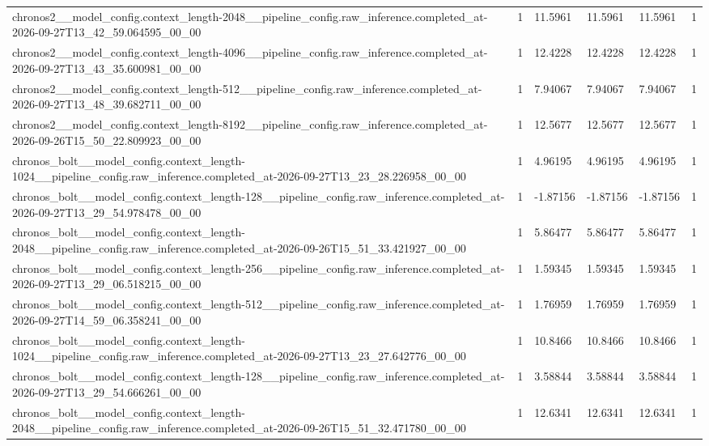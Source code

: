\begin{tabular}{llllll}
chronos2\_\_model\_config.context\_length-2048\_\_pipeline\_config.raw\_inference.completed\_at-2026-09-27T13\_42\_59.064595\_00\_00 & 1 & 11.5961 & 11.5961 & 11.5961 & 1 \\
chronos2\_\_model\_config.context\_length-4096\_\_pipeline\_config.raw\_inference.completed\_at-2026-09-27T13\_43\_35.600981\_00\_00 & 1 & 12.4228 & 12.4228 & 12.4228 & 1 \\
chronos2\_\_model\_config.context\_length-512\_\_pipeline\_config.raw\_inference.completed\_at-2026-09-27T13\_48\_39.682711\_00\_00 & 1 & 7.94067 & 7.94067 & 7.94067 & 1 \\
chronos2\_\_model\_config.context\_length-8192\_\_pipeline\_config.raw\_inference.completed\_at-2026-09-26T15\_50\_22.809923\_00\_00 & 1 & 12.5677 & 12.5677 & 12.5677 & 1 \\
chronos\_bolt\_\_model\_config.context\_length-1024\_\_pipeline\_config.raw\_inference.completed\_at-2026-09-27T13\_23\_28.226958\_00\_00 & 1 & 4.96195 & 4.96195 & 4.96195 & 1 \\
chronos\_bolt\_\_model\_config.context\_length-128\_\_pipeline\_config.raw\_inference.completed\_at-2026-09-27T13\_29\_54.978478\_00\_00 & 1 & -1.87156 & -1.87156 & -1.87156 & 1 \\
chronos\_bolt\_\_model\_config.context\_length-2048\_\_pipeline\_config.raw\_inference.completed\_at-2026-09-26T15\_51\_33.421927\_00\_00 & 1 & 5.86477 & 5.86477 & 5.86477 & 1 \\
chronos\_bolt\_\_model\_config.context\_length-256\_\_pipeline\_config.raw\_inference.completed\_at-2026-09-27T13\_29\_06.518215\_00\_00 & 1 & 1.59345 & 1.59345 & 1.59345 & 1 \\
chronos\_bolt\_\_model\_config.context\_length-512\_\_pipeline\_config.raw\_inference.completed\_at-2026-09-27T14\_59\_06.358241\_00\_00 & 1 & 1.76959 & 1.76959 & 1.76959 & 1 \\
chronos\_bolt\_\_model\_config.context\_length-1024\_\_pipeline\_config.raw\_inference.completed\_at-2026-09-27T13\_23\_27.642776\_00\_00 & 1 & 10.8466 & 10.8466 & 10.8466 & 1 \\
chronos\_bolt\_\_model\_config.context\_length-128\_\_pipeline\_config.raw\_inference.completed\_at-2026-09-27T13\_29\_54.666261\_00\_00 & 1 & 3.58844 & 3.58844 & 3.58844 & 1 \\
chronos\_bolt\_\_model\_config.context\_length-2048\_\_pipeline\_config.raw\_inference.completed\_at-2026-09-26T15\_51\_32.471780\_00\_00 & 1 & 12.6341 & 12.6341 & 12.6341 & 1 \\

\end{tabular}
